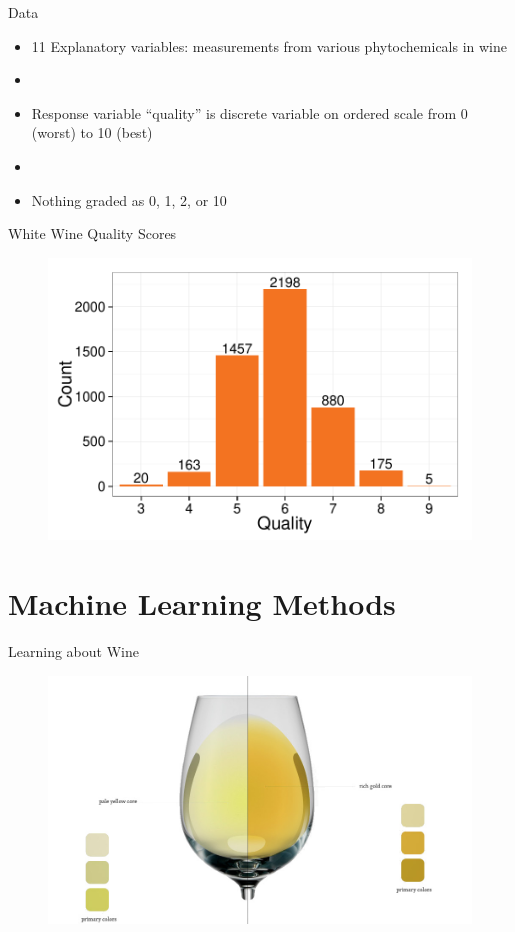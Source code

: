 \documentclass{beamer}
\begin{document}
\begin{frame}{Data}
\begin{itemize}
	
	\item 11 Explanatory variables: measurements from various phytochemicals in wine
	\item[]
	\item Response variable ``quality'' is discrete variable on ordered scale from 0 (worst) to 10 (best)
	\item[]
	\item Nothing graded as 0, 1, 2, or 10	
\end{itemize}
\end{frame}

\begin{frame}{White Wine Quality Scores}
\begin{figure}
	\centering
	\includegraphics[width=\textwidth]{../images/white_hist.pdf}
\end{figure}
\end{frame}

\section{Machine Learning Methods}

\begin{frame}{Learning about Wine}
	\begin{figure}
		\centering
		\includegraphics[width=\textwidth]{../images/matching.jpg}
	\end{figure}
\end{frame}
\end{document}
